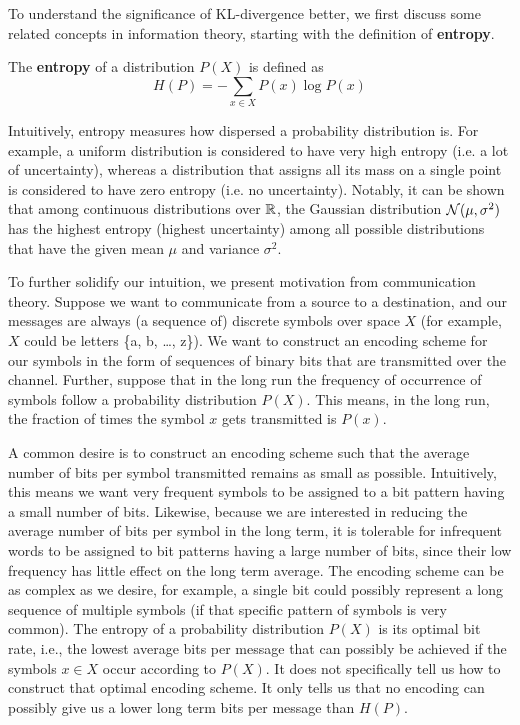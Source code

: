 \documentclass[a4paper]{article}
\begin{document}
To understand the significance of KL-divergence better,
we first discuss some related concepts in information theory,
starting with the definition of \textbf{entropy}.
\begin{defi}
  The \textbf{entropy} of a distribution $P(X)$
  is defined as
  \[
  H(P) = - \sum_{x \in X} P(x) \log P(x)
  \]
\end{defi}

Intuitively, entropy measures how dispersed a probability
distribution is. For example, a uniform distribution is
considered to have very high entropy (i.e. a lot of uncertainty),
whereas a distribution that assigns all its mass on a single
point is considered to have zero entropy (i.e. no uncertainty).
Notably, it can be shown that among continuous distributions
over $\mathbb{R}$, the Gaussian distribution $\mathcal{N}(\mu, \sigma^2)$ has
the highest entropy (highest uncertainty) among all possible
distributions that have the given mean $\mu$ and variance $\sigma^2$.

To further solidify our intuition, we present motivation from
communication theory. Suppose we want to communicate from a
source to a destination, and our messages are always
(a sequence of) discrete symbols over space $X$
(for example, $X$ could be letters \{a, b, \dots, z\}).
We want to construct an encoding scheme for our symbols
in the form of sequences of binary bits that are transmitted
over the channel. Further, suppose that in the long run the
frequency of occurrence of symbols follow a probability
distribution $P(X)$. This means, in the long run, the fraction
of times the symbol $x$ gets transmitted is $P(x)$.

A common desire is to construct an encoding scheme such that
the average number of bits per symbol transmitted remains as
small as possible. Intuitively, this means we want very
frequent symbols to be assigned to a bit pattern having a
small number of bits. Likewise, because we are interested in
reducing the average number of bits per symbol in the long
term, it is tolerable for infrequent words to be assigned to
bit patterns having a large number of bits, since their low
frequency has little effect on the long term average. The
encoding scheme can be as complex as we desire, for example,
a single bit could possibly represent a long sequence of
multiple symbols (if that specific pattern of symbols is very
common). The entropy of a probability distribution $P(X)$ is
its optimal bit rate, i.e., the lowest average bits per
message that can possibly be achieved if the symbols $x \in X$
occur according to $P(X)$. It does not specifically tell us
how to construct that optimal encoding scheme. It only tells
us that no encoding can possibly give us a lower long term
bits per message than $H(P)$.
\end{document}
